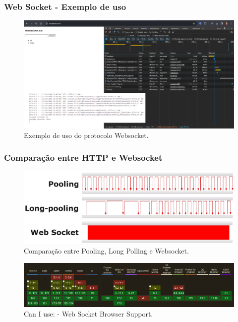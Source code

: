 \documentclass[
	10pt, %
	t, %
]{beamer}
\begin{document}
\begin{frame}
	\frametitle{Web Socket - Exemplo de uso}

	\begin{figure}
		\centering
		\includegraphics[width=0.9\linewidth]{websocket_example.png}
		\caption{Exemplo de uso do protocolo Websocket.}
		\label{fig:websocket_example}
	\end{figure}

\end{frame}

\begin{frame}
	\frametitle{Comparação entre HTTP e Websocket}

	\begin{figure}
		\centering
		\includegraphics[width=0.8\linewidth]{po_lp_ws.png}
		\caption{Comparação entre Pooling, Long Polling e Websocket.}
		\label{fig:websocket_example2}
	\end{figure}

	\begin{figure}
		\centering
		\includegraphics[width=0.8\linewidth]{ws_support.png}
		\caption{Can I use: - Web Socket Browser Support.}
		\label{fig:websocket_support}
	\end{figure}

\end{frame}
\end{document}
